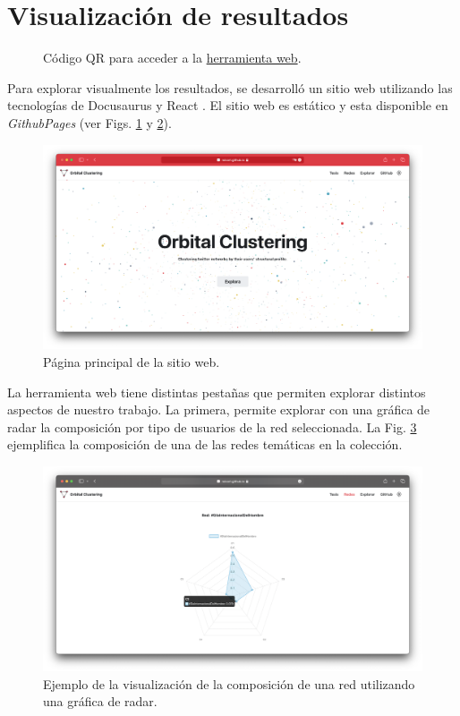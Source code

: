 \section{Visualización de resultados}
 \begin{figure}[htbp]
   \centering
   
    \caption{Código QR para acceder a la \href{https://roicort.github.io/OrbitalClustering}{herramienta web}.}
    \label{img:web-qr}
\end{figure}

Para explorar visualmente los resultados, se desarrolló un sitio web utilizando las tecnologías de Docusaurus \cite{meta_docusaurus_2022} y React \cite{meta_react_2013}. El sitio web es estático y esta disponible en \textit{GithubPages} (ver Figs. \ref{img:web-qr} y \ref{img:web-main}). 

 \begin{figure}
   \centering
   \includegraphics[width=1\textwidth]{images/web-main.png}
    \caption{Página principal de la sitio web.}
    \label{img:web-main}
\end{figure}

La herramienta web tiene distintas pestañas que permiten explorar distintos aspectos de nuestro trabajo. La primera, permite explorar con una gráfica de radar la composición por tipo de usuarios de la red seleccionada. La Fig. \ref{img:web-comp} ejemplifica la composición de una de las redes temáticas en la colección.

 \begin{figure}
   \centering
   \includegraphics[width=1\textwidth]{images/web-comp.png}
    \caption{Ejemplo de la visualización de la composición de una red utilizando una gráfica de radar.}
    \label{img:web-comp}
\end{figure}


